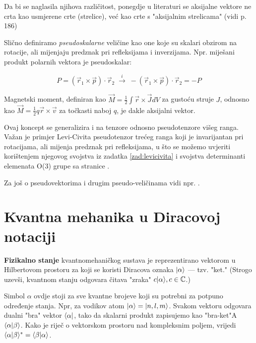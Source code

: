 Da bi se naglasila njihova različitost,
ponegdje u literaturi se aksijalne vektore ne crta kao usmjerene crte
(strelice), već kao crte s "aksijalnim strelicama" (vidi 
\cite{Bronstejn:2004} p. 186)

\centerline{}

Slično definiramo \emph{pseudoskalarne} veličine kao one koje su skalari
obzirom na rotacije, ali mijenjaju predznak pri refleksijama i inverzijama.
Npr. miješani produkt polarnih vektora je pseudoskalar:

\[
P = (\vec{r}_1 \times \vec{p}) \cdot \vec{r}_2  \; \stackrel{i}{\longrightarrow} \;
  - (\vec{r}_1 \times \vec{p}) \cdot \vec{r}_2 = - P
\]

Magnetski moment, definiran kao $\vec{M} = \frac{1}{2} \int \vec{r}
\times \vec{J} dV$ za gustoću struje $J$, odnosno kao
$\vec{M} = \frac{1}{2} q \vec{r} \times \vec{v}$ za točkasti
naboj $q$, je dakle aksijalni vektor.

Ovaj koncept se generalizira i na tenzore odnosno pseudotenzore višeg ranga.
Važan je primjer Levi-Civita pseudotenzor 
trećeg ranga koji je invarijantan
pri rotacijama, ali mijenja predznak pri refleksijama, u što se možemo uvjeriti
korištenjem njegovog svojstva iz zadatka \ref{zad:levicivita} i svojstva
determinanti elemenata O(3) grupe sa stranice \pageref{pag:detO3}.

Za još o pseudovektorima i drugim pseudo-veličinama vidi
npr. \cite{Arfken:1995}.


\chapter{Kvantna mehanika u Diracovoj notaciji}
\label{sec:qm}

\textbf{Fizikalno stanje} kvantnomehaničkog sustava
je reprezentirano vektorom u Hilbertovom prostoru za
koji se koristi Diracova oznaka
 $| \alpha \rangle$ --- tzv. "ket." 
(Strogo uzevši, kvantnom stanju odgovara
čitava "zraka" $c| \alpha \rangle, c\in\mathbb{C}$.)

Simbol $\alpha$ ovdje stoji za sve kvantne brojeve koji su potrebni za potpuno
određenje stanja. Npr, za vodikov atom $| \alpha \rangle=| n,l,m \rangle$.
Svakom vektoru odgovara dualni "bra" vektor $\langle \alpha |$, tako
da skalarni produkt zapisujemo kao "bra-ket"A
$\langle \alpha |\beta \rangle$. Kako je riječ o vektorskom prostoru
nad kompleksnim poljem, vrijedi
$\langle \alpha |\beta \rangle^{*} = \langle \beta |\alpha \rangle$.


